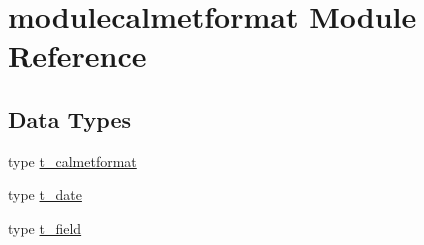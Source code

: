 \hypertarget{namespacemodulecalmetformat}{}\section{modulecalmetformat Module Reference}
\label{namespacemodulecalmetformat}
\subsection*{Data Types}
\begin{DoxyCompactItemize}
\item 
type \mbox{\hyperlink{structmodulecalmetformat_1_1t__calmetformat}{t\+\_\+calmetformat}}
\item 
type \mbox{\hyperlink{structmodulecalmetformat_1_1t__date}{t\+\_\+date}}
\item 
type \mbox{\hyperlink{structmodulecalmetformat_1_1t__field}{t\+\_\+field}}
\end{DoxyCompactItemize}
